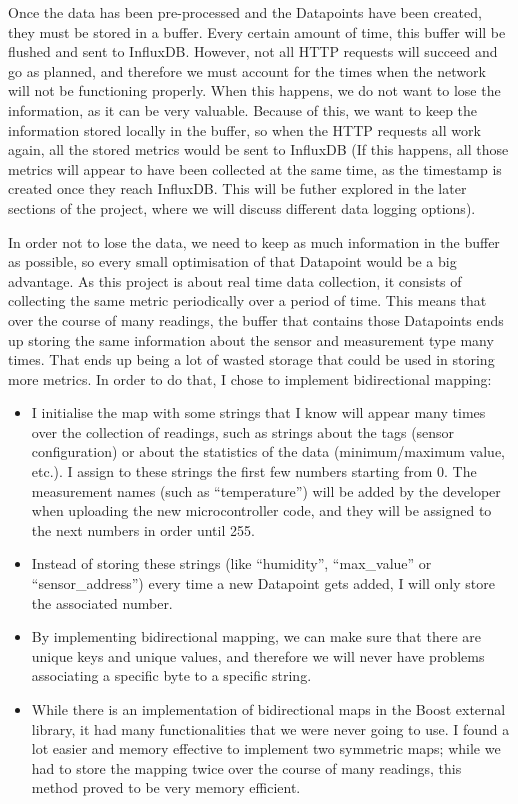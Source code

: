 \documentclass[12pt]{article}
\begin{document}
Once the data has been pre-processed and the Datapoints have been created, they must be stored in a buffer. Every certain amount of time, this buffer will be flushed and sent to InfluxDB. However, not all HTTP requests will succeed and go as planned, and therefore we must account for the times when the network will not be functioning properly. When this happens, we do not want to lose the information, as it can be very valuable. Because of this, we want to keep the information stored locally in the buffer, so when the HTTP requests all work again, all the stored metrics would be sent to InfluxDB (If this happens, all those metrics will appear to have been collected at the same time, as the timestamp is created once they reach InfluxDB. This will be futher explored in the later sections of the project, where we will discuss different data logging options).\par

In order not to lose the data, we need to keep as much information in the buffer as possible, so every small optimisation of that Datapoint would be a big advantage. As this project is about real time data collection, it consists of collecting the same metric periodically over a period of time. This means that over the course of many readings, the buffer that contains those Datapoints ends up storing the same information about the sensor and measurement type many times. That ends up being a lot of wasted storage that could be used in storing more metrics. In order to do that, I chose to implement bidirectional mapping: \par

\begin{itemize}
    \item I initialise the map with some strings that I know will appear many times over the collection of readings, such as strings about the tags (sensor configuration) or about the statistics of the data (minimum/maximum value, etc.). I assign to these strings the first few numbers starting from 0. The measurement names (such as ``temperature'') will be added by the developer when uploading the new microcontroller code, and they will be assigned to the next numbers in order until 255.
    \item Instead of storing these strings (like ``humidity'', ``max\_value'' or ``sensor\_address'') every time a new Datapoint gets added, I will only store the associated number. 
    \item By implementing bidirectional mapping, we can make sure that there are unique keys and unique values, and therefore we will never have problems associating a specific byte to a specific string.
    \item While there is an implementation of bidirectional maps in the Boost external library, it had many functionalities that we were never going to use. I found a lot easier and memory effective to implement two symmetric maps; while we had to store the mapping twice over the course of many readings, this method proved to be very memory efficient. 
\end{itemize}
\end{document}
